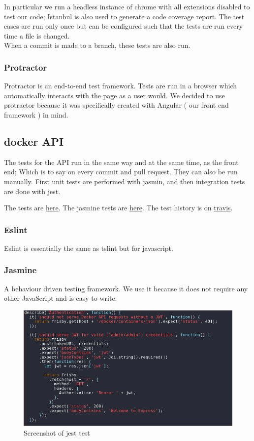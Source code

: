 \documentclass[]{article}
\begin{document}
In particular we run a headless instance of chrome with all extensions
disabled to test our code; Istanbul is also used to generate a code coverage
report. The test cases are run only once but can be configured such that the tests
are run every time a file is changed.
\\
When a commit is made to a branch, these tests are also run.

\subsubsection{Protractor}
Protractor is an end-to-end test framework. Tests are run in a browser which automatically interacts
with the page as a user would. We decided to use protractor because it was specifically
created with Angular ( our front end framework ) in mind.

\subsection{docker API}

The tests for the API run in the same way and at the same time, as the front end; Which is to
say on every commit and pull request. They can also be run manually. First unit
tests are performed with jasmin, and then integration tests are done with jest.

The tests are \href{https://github.com/TripleParity/docker-api/tree/master/spec}{here}.
The jasmine tests are \href{https://github.com/TripleParity/docks-api/blob/master/__tests__/api/api_spec.js}{here}.
The test history is on \href{https://travis-ci.org/TripleParity/docker-api}{travis}.

\subsubsection{Eslint}
Eslint is essentially the same as tslint but for javascript.

\subsubsection{Jasmine}
A behaviour driven testing framework. We use it because it 
does not require any other JavaScript and is easy to write.

\begin{figure}[H]
 	\centering
	\includegraphics[scale=0.5]{jest.png}
	\caption{Screenshot of jest test}
\end{figure}
\end{document}
